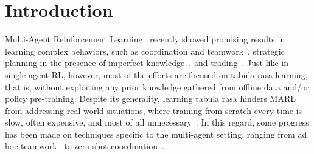 \section{Introduction}
\label{sec:intro}



Multi-Agent Reinforcement Learning~\citep[MARL,][]{marl-book} recently showed promising results in learning complex behaviors, such as coordination and teamwork~\citep{samvelyan2019starcraft}, strategic planning in the presence of imperfect knowledge~\citep{perolat2022mastering}, and trading~\citep{johanson2022emergentbarteringbehaviourmultiagent}. Just like in single agent RL, however, most of the efforts are focused on tabula rasa learning, that is, without exploiting any prior knowledge gathered from offline data and/or policy pre-training. Despite its generality, learning tabula rasa hinders MARL from addressing real-world situations, where training from scratch every time is slow, often expensive, and most of all unnecessary~\citep{agarwal2022reincarnating}. In this regard, some progress has been made on techniques specific to the multi-agent setting, ranging from ad hoc teamwork~\citep{mirsky2022survey} to zero-shot coordination~\citep{hu2020other}. 

